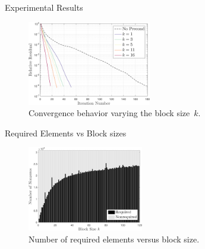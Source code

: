 \documentclass{beamer}
\begin{document}
\begin{frame}{Experimental Results}

\begin{figure}
\centering
\includegraphics[width=0.48\textwidth]{convergence}
\caption{Convergence behavior varying the block size~$k$.}
\label{f:convergence}
\end{figure}

\end{frame}

\begin{frame}{Required Elements vs Block sizes}
\begin{figure}
\centering
\includegraphics[width=0.45\textwidth]{nnz_bar_required_elements}
\caption{Number of required elements versus block size.}
\label{f:required_elements}
\end{figure}
\end{frame}
\end{document}
